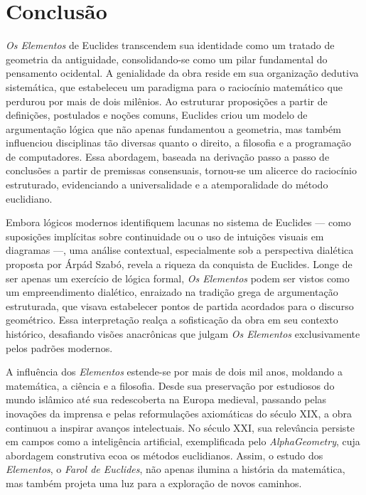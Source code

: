 \documentclass{hipatia}
\begin{document}
\section{Conclusão}

\emph{Os Elementos} de Euclides transcendem sua identidade como um
tratado de geometria da antiguidade, consolidando-se como um
pilar fundamental do pensamento ocidental. A genialidade da
obra reside em sua organização dedutiva sistemática, que
estabeleceu um paradigma para o raciocínio matemático que
perdurou por mais de dois milênios. Ao estruturar
proposições a partir de definições, postulados e noções
comuns, Euclides criou um modelo de argumentação lógica que
não apenas fundamentou a geometria, mas também influenciou
disciplinas tão diversas quanto o direito, a filosofia e a
programação de computadores. Essa abordagem, baseada na
derivação passo a passo de conclusões a partir de premissas
consensuais, tornou-se um alicerce do raciocínio
estruturado, evidenciando a universalidade e a
atemporalidade do método euclidiano.

Embora lógicos modernos identifiquem lacunas no sistema de
Euclides --- como suposições implícitas sobre continuidade
ou o uso de intuições visuais em diagramas ---, uma análise
contextual, especialmente sob a perspectiva dialética
proposta por Árpád Szabó, revela a riqueza da conquista de
Euclides. Longe de ser apenas um exercício de lógica formal,
\emph{Os Elementos} podem ser vistos como um empreendimento
dialético, enraizado na tradição grega de argumentação
estruturada, que visava estabelecer pontos de partida
acordados para o discurso geométrico. Essa interpretação
realça a sofisticação da obra em seu contexto histórico,
desafiando visões anacrônicas que julgam \emph{Os Elementos}
exclusivamente pelos padrões modernos.

A influência dos \emph{Elementos} estende-se por mais de dois mil
anos, moldando a matemática, a ciência e a filosofia. Desde
sua preservação por estudiosos do mundo islâmico até sua
redescoberta na Europa medieval, passando pelas inovações da
imprensa e pelas reformulações axiomáticas do século XIX, a
obra continuou a inspirar avanços intelectuais. No século
XXI, sua relevância persiste em campos como a inteligência
artificial, exemplificada pelo \emph{AlphaGeometry},
cuja abordagem construtiva ecoa os métodos
euclidianos. Assim,
o estudo dos \emph{Elementos}, o \emph{Farol de Euclides}, não apenas ilumina a história da
matemática, mas também projeta uma luz para a
exploração de novos caminhos.
\end{document}
